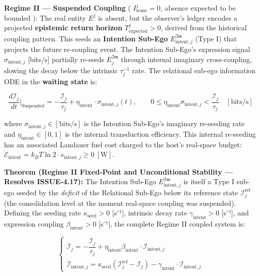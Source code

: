 \documentclass[11pt,a4paper]{article}
\theoremstyle{definition}
\theoremstyle{remark}
\begin{document}
\textbf{Regime II — Suspended Coupling} ( $I_{\text{sense}}^j = 0$, absence expected to be bounded ): The real entity $E^j$ is absent, but the observer's ledger encodes a projected \textbf{epistemic return horizon} $T_{\text{expected}}^j > 0$, derived from the historical coupling pattern. This seeds an \textbf{Intention Sub-Ego} $E_{\text{intent},j}^{\mathfrak{Im}}$ (Type I) that projects the future re-coupling event. The Intention Sub-Ego's expression signal $\sigma_{\text{intent},j}$ [bits/s] partially re-seeds $E_j^{\mathfrak{Im}}$ through internal imaginary cross-coupling, slowing the decay below the intrinsic $\tau_j^{-1}$ rate. The relational sub-ego information ODE in the \textbf{waiting state} is:


\begin{equation}
\boxed{\frac{d\mathcal{I}_j}{dt}\Bigg|_{\text{Suspended}} = -\frac{\mathcal{I}_j}{\tau_j} + \eta_{\text{intent}} \cdot \sigma_{\text{intent},j}(t), \qquad 0 \leq \eta_{\text{intent}} \sigma_{\text{intent},j} < \frac{\mathcal{I}_j}{\tau_j} \quad [\text{bits/s}]}
\end{equation}


where $\sigma_{\text{intent},j} \in [\text{bits/s}]$ is the Intention Sub-Ego's imaginary re-seeding rate and $\eta_{\text{intent}} \in [0,1]$ is the internal transduction efficiency. This internal re-seeding has an associated Landauer fuel cost charged to the host's real-space budget: $\dot{\mathcal{E}}_{\text{intent}} = k_B T \ln 2 \cdot \dot{s}_{\text{intent},j} \geq 0 \ [\text{W}]$.

\textbf{Theorem (Regime II Fixed-Point and Unconditional Stability — Resolves ISSUE-4.17):} The Intention Sub-Ego $E_{\text{intent},j}^{\mathfrak{Im}}$ is itself a Type I sub-ego seeded by the \textit{deficit} of the Relational Sub-Ego below its reference state $\mathcal{I}_j^{\text{ref}}$ (the consolidation level at the moment real-space coupling was suspended). Defining the seeding rate $\kappa_{\text{seed}} > 0$ [s⁻¹], intrinsic decay rate $\gamma_{\text{intent}} > 0$ [s⁻¹], and expression coupling $\beta_{\text{intent}} > 0$ [s⁻¹], the complete Regime II coupled system is:


\begin{equation}
\begin{cases} \dot{\mathcal{I}}_j = -\dfrac{\mathcal{I}_j}{\tau_j} + \eta_{\text{intent}}\beta_{\text{intent}} \cdot \mathcal{I}_{\text{intent},j} \\[8pt] \dot{\mathcal{I}}_{\text{intent},j} = \kappa_{\text{seed}}\!\left(\mathcal{I}_j^{\text{ref}} - \mathcal{I}_j\right) - \gamma_{\text{intent}} \cdot \mathcal{I}_{\text{intent},j} \end{cases}
\end{equation}
\end{document}
